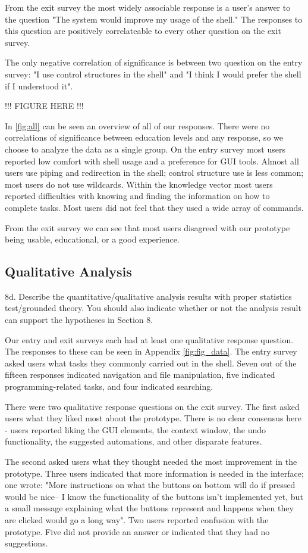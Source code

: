 From the exit survey the most widely associable response is a user's answer to
the question "The system would improve my usage of the shell." The responses to
this question are positively correlateable to every other question on the exit
survey.

The only negative correlation of significance is between two question on the
entry survey: "I use control structures in the shell" and "I think I would
prefer the shell if I understood it".

!!! FIGURE HERE !!!

In \ref{fig:all} can be seen an overview of all of our responses. There were no
correlations of significance between education levels and any response, so we
choose to analyze the data as a single group. On the entry survey most users
reported low comfort with shell usage and a preference for GUI tools. Almost all
users use piping and redirection in the shell; control structure use is less
common; most users do not use wildcards. Within the knowledge vector most users
reported difficulties with knowing and finding the information on how to
complete tasks. Most users did not feel that they used a wide array of commands.

From the exit survey we can see that most users disagreed with our prototype
being usable, educational, or a good experience.

\subsection{Qualitative Analysis}
    8d. Describe the quantitative/qualitative analysis results with proper
    statistics test/grounded theory. You should also indicate whether or not the
    analysis result can support the hypotheses in Section 8.

Our entry and exit surveys each had at least one qualitative response question.
The responses to these can be seen in Appendix \ref{fig:fig_data}.
The entry survey asked users what tasks they commonly carried out in the shell.
Seven out of the fifteen responses indicated navigation and file manipulation,
five indicated programming-related tasks, and four indicated searching.

There were two qualitative response questions on the exit survey. The first
asked users what they liked most about the prototype. There is no clear
consensus here - users reported liking the GUI elements, the context window, the
undo functionality, the suggested automations, and other disparate features.

The second asked users what they thought needed the most improvement in the
prototype. Three users indicated that more information is needed in the
interface; one wrote: "More instructions on what the buttons on bottom will do
if pressed would be nice-- I know the functionality of the buttons isn't
implemented yet, but a small message explaining what the buttons represent and
happens when they are clicked would go a long way". Two users reported confusion
with the prototype. Five did not provide an answer or indicated that they had no
suggestions.

